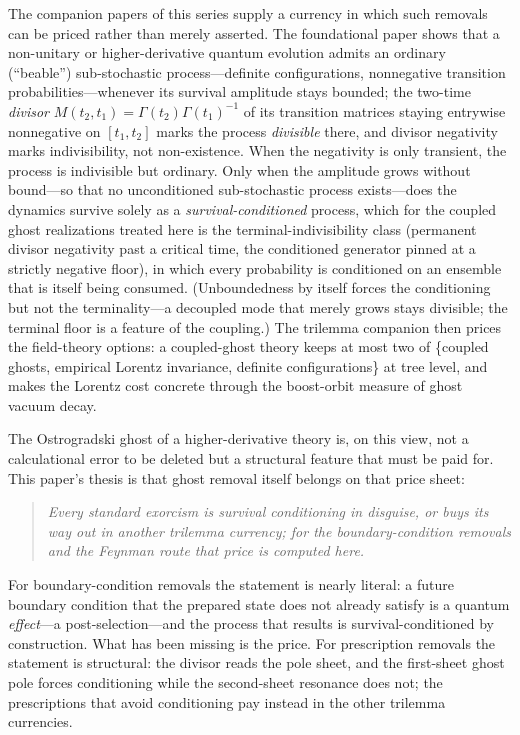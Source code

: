 \documentclass[11pt]{article}
\theoremstyle{definition}
\theoremstyle{remark}
\begin{document}
The companion papers of this series supply a currency in which such
removals can be priced rather than merely asserted. The foundational
paper \cite{indivisible} shows that a non-unitary or higher-derivative
quantum evolution admits an ordinary (``beable'') sub-stochastic
process---definite configurations, nonnegative transition
probabilities---whenever its survival amplitude stays bounded; the
two-time \emph{divisor}
$M(t_{2},t_{1})=\Gamma(t_{2})\Gamma(t_{1})^{-1}$ of its transition
matrices staying entrywise nonnegative on $[t_{1},t_{2}]$ marks the
process \emph{divisible} there, and divisor negativity marks
indivisibility, not non-existence. When the negativity is only
transient, the process is indivisible but ordinary. Only when the
amplitude grows without bound---so that no unconditioned sub-stochastic
process exists---does the dynamics survive solely as a
\emph{survival-conditioned} process, which for the coupled ghost
realizations treated here is the terminal-indivisibility class
(permanent divisor negativity past a critical time, the conditioned
generator pinned at a strictly negative floor), in which every
probability is conditioned on an ensemble that is itself being consumed.
(Unboundedness by itself forces the conditioning but not the
terminality---a decoupled mode that merely grows stays divisible; the
terminal floor is a feature of the coupling.) The
trilemma companion \cite{choosing} then prices the field-theory
options: a coupled-ghost theory keeps at most two of \{coupled
ghosts, empirical Lorentz invariance, definite configurations\} at
tree level, and \cite{instantaneous} makes the Lorentz cost concrete
through the boost-orbit measure of ghost vacuum decay.

The Ostrogradski ghost of a higher-derivative theory is, on this
view, not a calculational error to be deleted but a structural
feature that must be paid for. This paper's thesis is that ghost
removal itself belongs on that price sheet:
\begin{quote}
\emph{Every standard exorcism is survival conditioning in disguise,
or buys its way out in another trilemma currency; for the
boundary-condition removals and the Feynman route that price is
computed here.}
\end{quote}
For boundary-condition removals the statement is nearly literal: a
future boundary condition that the prepared state does not already
satisfy is a quantum \emph{effect}---a post-selection---and the
process that results is survival-conditioned by construction. What
has been missing is the price. For prescription removals the
statement is structural: the divisor reads the pole sheet, and the
first-sheet ghost pole forces conditioning while the second-sheet
resonance does not; the prescriptions that avoid conditioning pay
instead in the other trilemma currencies.
\end{document}
